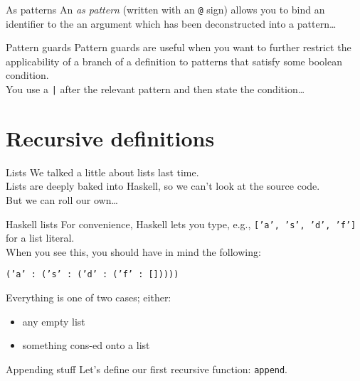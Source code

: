 \documentclass[presentation]{beamer}
\begin{document}
\begin{frame}[label={sec:org60a6096},fragile]{As patterns}
 An \emph{as pattern} (written with an \texttt{@} sign) allows you to bind an identifier to
the an argument which has been deconstructed into a pattern\ldots{}
\end{frame}

\begin{frame}[label={sec:org6820b80},fragile]{Pattern guards}
 Pattern guards are useful when you want to further restrict the applicability
of a branch of a definition to patterns that satisfy some boolean condition.
\\[0pt]
\pause \bigskip
You use a \texttt{|} after the relevant pattern and then state the condition\ldots{}
\end{frame}

\section{Recursive definitions}
\label{sec:orgb7c6e4d}
\begin{frame}[label={sec:org5cfc2b1}]{Lists}
We talked a little about lists last time. \\[0pt]
\pause \bigskip
Lists are deeply baked into Haskell, so we can't look at the source code. \\[0pt]
\pause \bigskip
But we can roll our own\ldots{}
\end{frame}

\begin{frame}[label={sec:org3b3c92a},fragile]{Haskell lists}
 For convenience, Haskell lets you type, e.g., \texttt{['a', 's', 'd', 'f']} for a list
literal. \\[0pt]
\pause \bigskip
When you see this, you should have in mind the following:
\begin{center}
\texttt{('a' : ('s' : ('d' : ('f' : []))))}
\end{center}
\pause \bigskip
Everything is one of two cases; either:
\pause
\begin{itemize}[<+->]
\item any empty list
\item something cons-ed onto a list
\end{itemize}
\end{frame}

\begin{frame}[label={sec:org1e8f36f},fragile]{Appending stuff}
 Let's define our first recursive function: \texttt{append}.
\end{frame}
\end{document}
